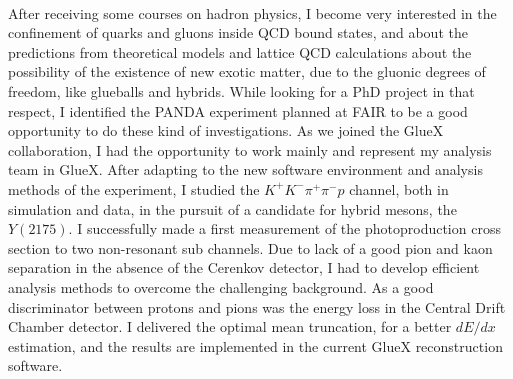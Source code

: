\documentclass[a4paper]{article}
\begin{document}
~\par After receiving some courses on hadron physics, I become very interested in the confinement of quarks and gluons inside QCD bound states, and about the predictions from theoretical models and lattice QCD calculations about the possibility of the existence of new exotic matter, due to the gluonic degrees of freedom, like glueballs and hybrids. While looking for a PhD project in that respect, I identified the PANDA experiment planned at FAIR to be a good opportunity to do these kind of investigations. As we joined the GlueX collaboration, I had the opportunity to work mainly and represent my analysis team in GlueX. After adapting to the new software environment and analysis methods of the experiment, I studied the $K^{+}K^{-}\pi^{+}\pi^{-}p$ channel, both in simulation and data, in the pursuit of a candidate for hybrid mesons, the $Y(2175)$. I successfully made a first measurement of the photoproduction cross section to two non-resonant sub channels. Due to lack of a good pion and kaon separation in the absence of the Cerenkov detector, I had to develop efficient analysis methods to overcome the challenging background. As a good discriminator between protons and pions was the energy loss in the Central Drift Chamber detector. I delivered the optimal mean truncation, for a better $dE/dx$ estimation, and the results are implemented in the current GlueX reconstruction software.
\end{document}
